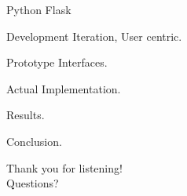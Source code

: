 \documentclass[xcolor=svgnames,10pt,aspectratio=1610]{beamer}
\begin{document}
\begin{frame}
  \begin{center}
    Python Flask
  \end{center}
\end{frame}

\begin{frame}
  \begin{center}
    Development Iteration, User centric.
  \end{center}
\end{frame}

\begin{frame}
  \begin{center}
    Prototype Interfaces.
  \end{center}
\end{frame}

\begin{frame}
  \begin{center}
    Actual Implementation.
  \end{center}
\end{frame}

\begin{frame}
  \begin{center}
    Results.
  \end{center}
\end{frame}

\begin{frame}
  \begin{center}
    Conclusion.
  \end{center}
\end{frame}

\begin{frame}
  \begin{center}
    {\huge
    Thank you for listening! \\
    \vspace{1cm}
    Questions?
    }
  \end{center}
\end{frame}
\end{document}
